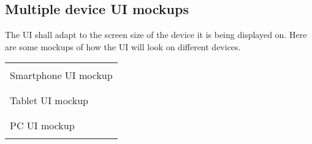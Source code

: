 \subsection{Multiple device UI mockups}
The UI shall adapt to the screen size of the device it is being displayed on. Here are some mockups of how the UI will look on different devices.\\
\begin{tabu}{X[c]} 
     \\
    Smartphone UI mockup \\
    \\
     \\
    Tablet UI mockup \\
    \\
     \\
    PC UI mockup \\
    \\
\end{tabu}